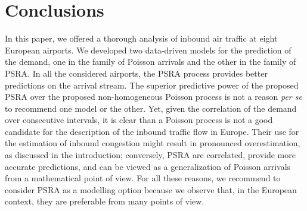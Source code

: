 \documentclass[final,review]{elsarticle}
\begin{document}
\section{Conclusions}\label{sec:conclusions}






  In this paper, we offered a thorough analysis of inbound air traffic at eight European airports. We developed two data-driven models for the prediction of the demand, one in the family of Poisson arrivals and the other in the family of \ac{PSRA}.
  In all the considered airports, the \ac{PSRA} process provides better predictions on the arrival stream.
  The superior predictive power of the proposed \ac{PSRA} over the proposed non-homogeneous Poisson process is not a reason \emph{per se} to recommend one model or the other.
  Yet, given the correlation of the demand over consecutive intervals, it is clear than a Poisson process is not a good candidate for the description of the inbound traffic flow in Europe. Their use for the estimation of inbound congestion might result in pronounced overestimation, as discussed in the introduction; conversely, \ac{PSRA} are correlated, provide more accurate predictions, and can be viewed as a generalization of Poisson arrivals from a mathematical point of view. For all these reasons, we recommend to consider \ac{PSRA} as a modelling option because we observe that, in the European context, they are preferable from many points of view.
\end{document}
